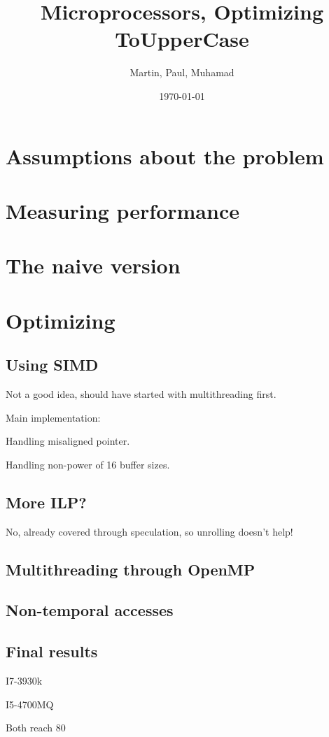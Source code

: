 \documentclass[10pt, fleqn]{article}
\title{Microprocessors, Optimizing ToUpperCase}
\author{Martin, Paul, Muhamad}
\date{\today}
\begin{document}
\maketitle

\section{Assumptions about the problem}

\section{Measuring performance}

\section{The naive version}

\section{Optimizing}

\subsection{Using SIMD}
Not a good idea, should have started with multithreading first.

Main implementation:

Handling misaligned pointer.

Handling non-power of 16 buffer sizes.

\subsection{More ILP?}
No, already covered through speculation, so unrolling doesn't help!

\subsection{Multithreading through OpenMP}

\subsection{Non-temporal accesses}

\subsection{Final results}

I7-3930k

I5-4700MQ

Both reach 80%

\iffalse
\begin{abstract}
		This is where the abstract goes
\end{abstract}
\fi

\iffalse
\begin{thebibliography}{9}
\bibitem{nano3}
  K. Grove-Rasmussen og Jesper Nygård,
  \emph{Kvantefænomener i Nanosystemer}.
  Niels Bohr Institute \& Nano-Science Center, Københavns Universitet

\end{thebibliography}
\fi
\end{document}
